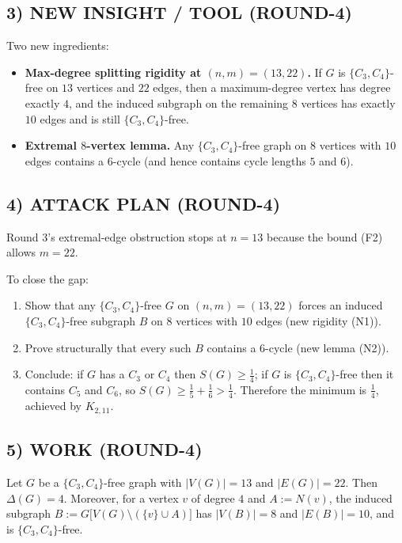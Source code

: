 \subsection*{3) NEW INSIGHT / TOOL (ROUND-4)}
Two new ingredients:
\begin{itemize}
\item[(N1)] \textbf{Max-degree splitting rigidity at $(n,m)=(13,22)$.}
If $G$ is $\{C_3,C_4\}$-free on $13$ vertices and $22$ edges, then a maximum-degree vertex has degree exactly $4$, and the induced subgraph on the remaining $8$ vertices has exactly $10$ edges and is still $\{C_3,C_4\}$-free.
\item[(N2)] \textbf{Extremal $8$-vertex lemma.}
Any $\{C_3,C_4\}$-free graph on $8$ vertices with $10$ edges contains a $6$-cycle (and hence contains cycle lengths $5$ and $6$).
\end{itemize}

\subsection*{4) ATTACK PLAN (ROUND-4)}
Round 3's extremal-edge obstruction stops at $n=13$ because the bound (F2) allows $m=22$.

To close the gap:
\begin{enumerate}
\item Show that any $\{C_3,C_4\}$-free $G$ on $(n,m)=(13,22)$ forces an induced $\{C_3,C_4\}$-free subgraph $B$ on $8$ vertices with $10$ edges (new rigidity (N1)).
\item Prove structurally that every such $B$ contains a $6$-cycle (new lemma (N2)).
\item Conclude: if $G$ has a $C_3$ or $C_4$ then $S(G)\ge \frac14$; if $G$ is $\{C_3,C_4\}$-free then it contains $C_5$ and $C_6$, so $S(G)\ge \frac15+\frac16>\frac14$.
Therefore the minimum is $\frac14$, achieved by $K_{2,11}$.
\end{enumerate}

\subsection*{5) WORK (ROUND-4)}

\begin{lemma}\label{lem:13-22-rigidity}
Let $G$ be a $\{C_3,C_4\}$-free graph with $|V(G)|=13$ and $|E(G)|=22$.
Then $\Delta(G)=4$. Moreover, for a vertex $v$ of degree $4$ and $A:=N(v)$, the induced subgraph $B:=G\big[V(G)\setminus(\{v\}\cup A)\big]$ has $|V(B)|=8$ and $|E(B)|=10$, and is $\{C_3,C_4\}$-free.
\end{lemma}

